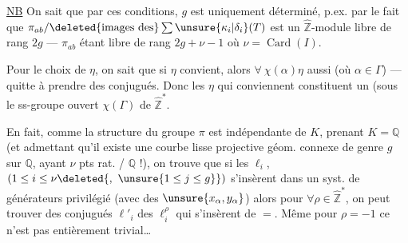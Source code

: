 \uline{NB} On sait que par ces conditions, \(g\) est uniquement déterminé,
p.ex. par le fait que
\(\pi_{ab}/\deleted{\text{images des}}\sum\unsure{\kappa_i|\delta_i}(T)\)
est un \(\widehat{\mathbb Z}\)-module libre de rang \(2g\) --- \(\pi_{ab}\)
étant libre de rang \(2g+\nu-1\) où \(\nu=\operatorname{Card}(I)\).

Pour le choix de \(\eta\), on sait que si \(\eta\) convient, alors
\(\forall\ \chi(\alpha)\eta\) aussi (où \(\alpha\in\Gamma\)) --- quitte à prendre
des conjugués. Donc les \(\eta\) qui conviennent  constituent
un  (sous le ss-groupe ouvert
\(\chi(\Gamma)\) de \(\widehat{\mathbb Z}^{*}\).





En fait, comme la structure du groupe \(\pi\) est indépendante de \(K\),
prenant \(K=\mathbb Q\) (et admettant qu'il existe une courbe lisse projective
géom. connexe de genre \(g\) sur \(\mathbb Q\), ayant \(\nu\) pts rat. / \(\mathbb Q\) !),
on trouve que si les \(\ell_i\), 
\((1\leq i\leq\nu\deleted{,\ \unsure{1\leq j\leq g}})\)
 s'insèrent dans un syst. de générateurs
privilégié (avec des \(\unsure{x_\alpha,y_\alpha}\)) alors pour
\(\forall\rho\in\widehat{\mathbb Z}^{*}\), on peut trouver des conjugués
\(\ell'_i\) des \(\ell_i^\rho\) qui s'insèrent de \(=\).
Même pour \(\rho=-1\) ce n'est pas entièrement trivial\ldots

